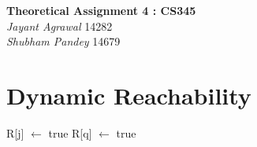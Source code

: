 \documentclass{article}
\begin{document}

\begin{center}
\textbf{\Large Theoretical Assignment 4 : CS345} \\
\textit{\large Jayant Agrawal}         14282 \\
\textit{\large Shubham Pandey}         14679
\end{center}

\section{Dynamic Reachability}

\begin{algorithm}
\label{dyn}
\begin{algorithmic}[1]
\State R[j] $\gets$ true
\State R[q] $\gets$ true 
\EndFor
\EndIf
\EndProcedure
\end{algorithmic}
\end{algorithm}
\end{document}
